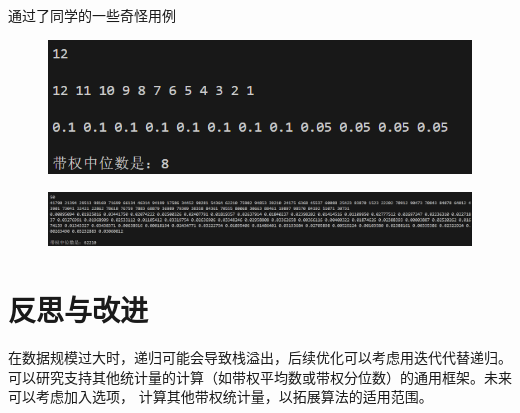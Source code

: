 \documentclass[UTF8]{ctexart}
\begin{document}
\newpage
通过了同学的一些奇怪用例
\begin{figure}[htbp]
    \centering
    \includegraphics[width=1\textwidth]{12.png}
\end{figure}
\begin{figure}[htbp]
    \centering
    \includegraphics[width=1\textwidth]{50.png}
\end{figure}

\section{反思与改进}
在数据规模过大时，递归可能会导致栈溢出，后续优化可以考虑用迭代代替递归。
可以研究支持其他统计量的计算（如带权平均数或带权分位数）的通用框架。未来可以考虑加入选项，
计算其他带权统计量，以拓展算法的适用范围。
\end{document}
